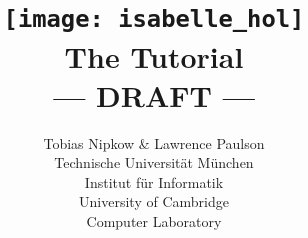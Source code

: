 \documentclass{article}
\begin{document}
\title{\texttt{[image: isabelle\_hol]}
       \\ \vspace{0.5cm} The Tutorial
       \\ --- DRAFT ---}
\author{Tobias Nipkow \& Lawrence Paulson\\[1ex]
Technische Universit{\"a}t M{\"u}nchen \\
Institut f{\"u}r Informatik \\[1ex]
University of Cambridge\\
Computer Laboratory}
\maketitle

\setcounter{page}{5}



\tableofcontents

\newpage{}












\printindex
\end{document}
